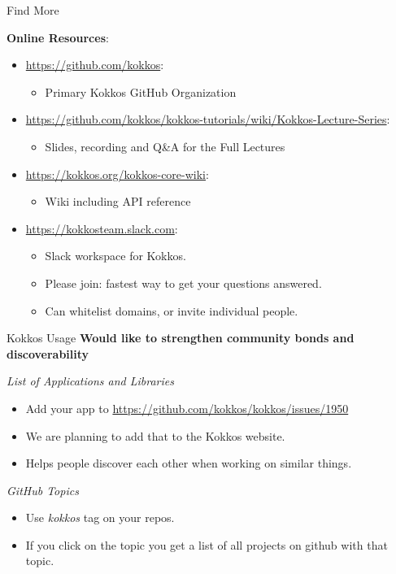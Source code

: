 \begin{frame}{Find More}

  \textbf{Online Resources}:

  \begin{itemize}
    \item \url{https://github.com/kokkos}:
          \begin{itemize}
            \item Primary Kokkos GitHub Organization
          \end{itemize}
    \item \url{https://github.com/kokkos/kokkos-tutorials/wiki/Kokkos-Lecture-Series}:
          \begin{itemize}
            \item{Slides, recording and Q\&A for the Full Lectures}
          \end{itemize}
    \item \url{https://kokkos.org/kokkos-core-wiki}:
          \begin{itemize}
            \item Wiki including API reference
          \end{itemize}
    \item \url{https://kokkosteam.slack.com}:
          \begin{itemize}
            \item Slack workspace for Kokkos.
            \item Please join: fastest way to get your questions answered.
            \item Can whitelist domains, or invite individual people.
          \end{itemize}
  \end{itemize}

\end{frame}

\begin{frame}[fragile]{Kokkos Usage}
  \textbf{Would like to strengthen community bonds and discoverability}

  \vspace{10pt}
  \textit{List of Applications and Libraries}
  \begin{itemize}
    \item Add your app to \url{https://github.com/kokkos/kokkos/issues/1950}
    \item We are planning to add that to the Kokkos website.
    \item Helps people discover each other when working on similar things.
  \end{itemize}

  \vspace{10pt}
  \textit{GitHub Topics}
  \begin{itemize}
    \item Use \textit{kokkos} tag on your repos.
    \item If you click on the topic you get a list of all projects on github with that topic.
  \end{itemize}
\end{frame}

